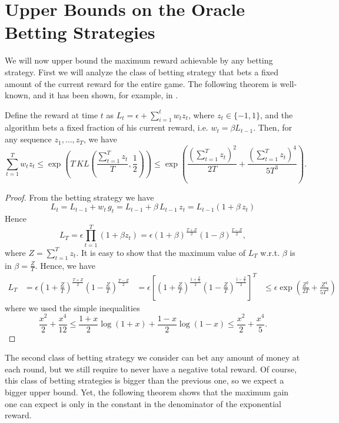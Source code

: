 \section{Upper Bounds on the Oracle Betting Strategies}

We will now upper bound the maximum reward achievable by any betting strategy.
First we will analyze the class of betting strategy that bets a fixed amount of the current reward for the entire game.
The following theorem is well-known, and it has been shown, for example, in \cite{}.

\begin{theorem}
Define the reward at time $t$ as $L_t=\epsilon + \sum_{i=1}^t w_t z_t$, where $z_t\in \{-1,1\}$, and the algorithm bets a fixed fraction of his current reward, i.e. $w_t=\beta L_{t-1}$. Then, for any sequence $z_1, \ldots, z_T$, we have
\[
\sum_{t=1}^T w_t z_t \leq \exp\left(T\, KL\left(\frac{\sum_{t=1}^T z_t}{T},\frac{1}{2}\right)\right) \leq \exp\left(\frac{(\sum_{t=1}^T z_t)^2}{2T}+\frac{(\sum_{t=1}^T z_t)^4}{5 T^3}\right).
\]
\end{theorem}
\begin{proof}
From the betting strategy we have
\[
L_t=L_{t-1} + w_t \, g_t = L_{t-1} + \beta \, L_{t-1} \, z_t = L_{t-1} (1+\beta \, z_t)
\]
Hence
\[
L_T=\epsilon \prod_{t=1}^T (1+\beta z_t) = \epsilon (1+\beta)^\frac{T+Z}{2} (1-\beta)^\frac{T-Z}{2},
\]
where $Z=\sum_{t=1}^T z_t$.
It is easy to show that the maximum value of $L_T$ w.r.t. $\beta$ is in $\beta=\frac{Z}{T}$. 
Hence, we have
\begin{align}
L_T &= \epsilon (1+\frac{Z}{T})^\frac{T+Z}{2} (1-\frac{Z}{T})^\frac{T-Z}{2} 
&= \epsilon \left[(1+\frac{Z}{T})^\frac{1+\frac{Z}{T}}{2} (1-\frac{Z}{T})^\frac{1-\frac{Z}{T}}{2}\right]^T 
&\leq \epsilon \exp \left(\frac{Z^2}{2 T} + \frac{Z^4}{5 T^3}\right)
\end{align}
where we used the simple inequalities
\[
\frac{x^2}{2} +\frac{x^4}{12}\leq \frac{1+x}{2} \log(1+x) + \frac{1-x}{2}\log(1-x) \leq \frac{x^2}{2} + \frac{x^4}{5}.
\]
\end{proof}

The second class of betting strategy we consider can bet any amount of money at each round, but we still require to never have a negative total reward. Of course, this class of betting strategies is bigger than the previous one, so we expect a bigger upper bound. Yet, the following theorem shows that the maximum gain one can expect is only in the constant in the denominator of the exponential reward.

